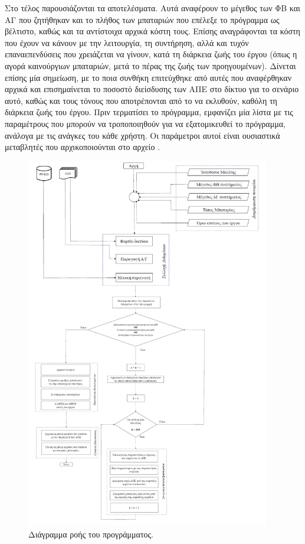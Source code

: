 \documentclass[12pt]{report}
\begin{document}
Στο τέλος παρουσιάζονται τα αποτελέσματα. Αυτά αναφέρουν το μέγεθος των ΦΒ και ΑΓ που ζητήθηκαν και το πλήθος των μπαταριών που επέλεξε το πρόγραμμα ως βέλτιστο, καθώς και τα αντίστοιχα αρχικά κόστη τους. Επίσης αναγράφονται τα κόστη
που έχουν να κάνουν με την λειτουργία, τη συντήρηση, αλλά και τυχόν επαναεπενδύσεις που χρειάζεται να γίνουν, κατά τη διάρκεια ζωής του έργου (όπως η αγορά καινούργιων μπαταριών, μετά το πέρας της ζωής των προηγουμένων). Δίνεται 
επίσης μία σημείωση, με το ποια συνθήκη επιτεύχθηκε από αυτές που αναφέρθηκαν αρχικά και επισημαίνεται το ποσοστό διείσδυσης των ΑΠΕ στο δίκτυο για το σενάριο αυτό, καθώς και τους τόνους {} που αποτρέπονται από το
να εκλυθούν, καθόλη τη διάρκεια ζωής του έργου. Πριν τερματίσει το πρόγραμμα, εμφανίζει μία λίστα με τις παραμέτρους που μπορούν να τροποποιηθούν για να εξατομικευθεί το πρόγραμμα, ανάλογα με τις ανάγκες του κάθε χρήστη. 
Οι παράμετροι αυτοί είναι ουσιαστικά μεταβλητές που αρχικοποιούνται στο αρχείο {}.

\begin{figure}[h]
				\center
				\includegraphics[width=0.95\textwidth]{flowchart}
				\captionsetup{width=0.8\textwidth}
				\caption{Διάγραμμα ροής του προγράμματος.}
				\label{fig:flowchart}
\end{figure}
\end{document}
